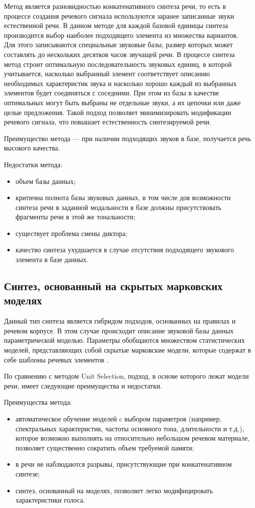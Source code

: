 Метод является разновидностью конкатенативного синтеза речи, то есть в процессе создания речевого сигнала используются заранее записанные звуки естественной речи. 
В данном методе для каждой базовой единицы синтеза производится выбор наиболее подходящего элемента из множества вариантов. 
Для этого записываются специальные звуковые базы, размер которых может составлять до нескольких десятков часов звучащей речи. 
В процессе синтеза метод строит оптимальную последовательность звуковых единиц, в которой учитывается, насколько выбранный элемент соответствует описанию необходимых характеристик звука и насколько хорошо каждый из выбранных элементов будет соединяться с соседними. 
При этом из базы в качестве оптимальных могут быть выбраны не отдельные звуки, а их цепочки или даже целые предложения. 
Такой подход позволяет минимизировать модификации речевого сигнала, что повышает естественность синтезируемой речи.

Преимущество метода --- при наличии подходящих звуков в базе, получается речь высокого качества.

Недостатки метода:
\begin{itemize}[label=---]
	\item объем базы данных;
	\item критична полнота базы звуковых данных, в том числе доя возможности синтеза речи в заданной модальности в базе должны присутствовать фрагменты речи в этой же тональности;
	\item существует проблема смены диктора;
	\item качество синтеза ухудшается в случае отсутствия подходящего звукового элемента в базе данных. 
\end{itemize}

\subsection{Синтез, основанный на скрытых марковских моделях}

Данный тип синтеза является гибридом подходов, основанных на правилах и речевом корпусе. 
В этом случае происходит описание звуковой базы данных параметрической моделью.
Параметры обобщаются множеством статистических моделей, представляющих собой скрытые марковские модели, которые содержат в себе шаблоны речевых элементов \cite{hmm}.

По сравнению с методом Unit Selection, подход, в основе которого лежат модели речи, имеет следующие преимущества и недостатки.

Преимущества метода:
\begin{itemize}[label=---]
	\item автоматическое обучение моделей c выбором параметров (например, спектральных характеристик, частоты основного тона, длительности и т.д.), которое возможно выполнять на относительно небольшом речевом материале, позволяет существенно сократить объем требуемой памяти;
	\item в речи не наблюдаются разрывы, присутствующие при конкатенативном синтезе;
	\item синтез, основанный на моделях, позволяет легко модифицировать характеристики голоса.
\end{itemize}

